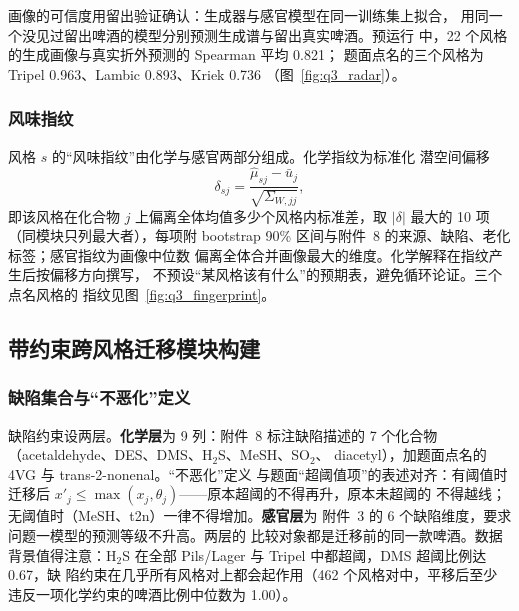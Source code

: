 \documentclass[12pt,a4paper]{article}
\begin{document}
画像的可信度用留出验证确认：生成器与感官模型在同一训练集上拟合，
用同一个没见过留出啤酒的模型分别预测生成谱与留出真实啤酒。预运行
中，22 个风格的生成画像与真实折外预测的 Spearman 平均 0.821；
题面点名的三个风格为 Tripel 0.963、Lambic 0.893、Kriek 0.736
（图~\ref{fig:q3_radar}）。


\subsubsection{风味指纹}

风格 $s$ 的``风味指纹''由化学与感官两部分组成。化学指纹为标准化
潜空间偏移
\begin{equation}
  \delta_{sj}=\frac{\hat\mu_{sj}-\bar u_j}{\sqrt{\Sigma_{W,jj}}},
\end{equation}
即该风格在化合物 $j$ 上偏离全体均值多少个风格内标准差，取
$|\delta|$ 最大的 10 项（同模块只列最大者），每项附 bootstrap
90\% 区间与附件~8 的来源、缺陷、老化标签；感官指纹为画像中位数
偏离全体合并画像最大的维度。化学解释在指纹产生后按偏移方向撰写，
不预设``某风格该有什么''的预期表，避免循环论证。三个点名风格的
指纹见图~\ref{fig:q3_fingerprint}。


\subsection{带约束跨风格迁移模块构建}

\subsubsection{缺陷集合与``不恶化''定义}

缺陷约束设两层。\textbf{化学层}为 9 列：附件~8 标注缺陷描述的
7 个化合物（acetaldehyde、DES、DMS、H$_2$S、MeSH、SO$_2$、
diacetyl），加题面点名的 4VG 与 trans-2-nonenal。``不恶化''定义
与题面``超阈值项''的表述对齐：有阈值时迁移后
$x'_j\le\max(x_j,\theta_j)$——原本超阈的不得再升，原本未超阈的
不得越线；无阈值时（MeSH、t2n）一律不得增加。\textbf{感官层}为
附件~3 的 6 个缺陷维度，要求问题一模型的预测等级不升高。两层的
比较对象都是迁移前的同一款啤酒。数据背景值得注意：H$_2$S 在全部
Pils/Lager 与 Tripel 中都超阈，DMS 超阈比例达 0.67，缺
陷约束在几乎所有风格对上都会起作用（462 个风格对中，平移后至少
违反一项化学约束的啤酒比例中位数为 1.00）。
\end{document}
